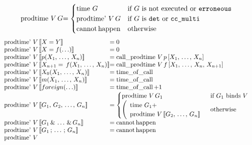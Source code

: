 \begin{algorithm}
\[
\begin{array}{l @{}l}
\prodtime V\,G                            &=
    \begin{cases}
        \timef G         & \text{if } G \text{ is not executed or
                            \derroneous} \\
        \prodtimep V\,G  & \text{if } G \text{ is \ddet or \dccmulti} \\
        \canthappen      & \text{otherwise}
    \end{cases} \\
\end{array}
\]
\[
\begin{array}{l @{}l @{}l}
\prodtimep V\,& \pat{X = Y}                        &= 0 \\
\prodtimep V\,& \pat{X = f(\ldots)}                &= 0 \\
\prodtimep V\,& \pat{p(X_1,\,\ldots,\,X_n)}        &=
    \callprodtime V\,p\,[X_1,\,\ldots,\,X_n] \\
\prodtimep V\,& \pat{X_{n+1} = \,f(X_1,\,\ldots,\,X_n)}  &=
    \callprodtime V\,f\,[X_1,\,\ldots,\,X_n,\,X_{n+1}] \\
\prodtimep V\,& \pat{X_0(X_1,\,\ldots,\,X_n)}      &= \timeofcall \\
\prodtimep V\,& \pat{m(X_1,\,\ldots,\,X_n)}        &= \timeofcall \\
\prodtimep V\,& \pat{foreign(\ldots)}              &= \timeofcall + 1 \\
\prodtimep V\,& \pat{G_1,\,G_2,\,\ldots,\,G_n}     &=
   \begin{cases}
       \prodtime V\,G_1
            & \text{if } G_1 \text{ binds } V \\
       \left(
       \begin{array}{l}
           \timef G_1 + \\ \prodtime V\,\pat{G_2,\,\ldots,\,G_n}
       \end{array}
       \right.
            & \text{otherwise}
   \end{cases} \\
\prodtimep V\,& \pat{G_1\,\&\,\ldots\,\&\,G_n}      &= \canthappen \\
\prodtimep V\,& \pat{G_1\,;\,\ldots\,;\,G_n}        &= \canthappen \\
\prodtimep V\,& 

\end{array}\]
\end{algorithm}
